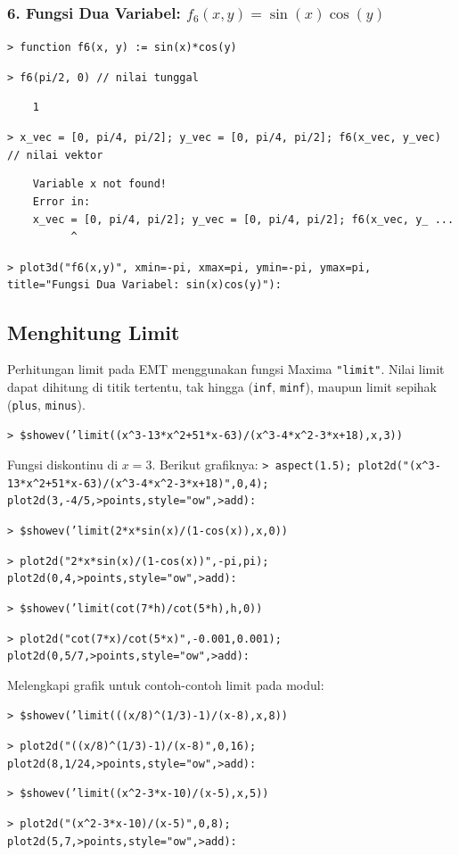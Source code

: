 \documentclass[11pt, a4paper]{article}
\newcommand{\emtcmd}[1]{\noindent\texttt{\textcolor{emtcommand}{>}\ #1}\par\smallskip}
\begin{document}
\subsubsection*{6. Fungsi Dua Variabel: $f_6(x, y) = \sin(x)\cos(y)$}
\emtcmd{function f6(x, y) := sin(x)*cos(y)}
\emtcmd{f6(pi/2, 0) \textcolor{emtcomment}{// nilai tunggal}}
\begin{verbatim}
    1
\end{verbatim}
\emtcmd{x\_vec = [0, pi/4, pi/2]; y\_vec = [0, pi/4, pi/2]; f6(x\_vec, y\_vec) \textcolor{emtcomment}{// nilai vektor}}
\begin{verbatim}
    Variable x not found!
    Error in:
    x_vec = [0, pi/4, pi/2]; y_vec = [0, pi/4, pi/2]; f6(x_vec, y_ ...
          ^
\end{verbatim}
\emtcmd{plot3d("f6(x,y)", xmin=-pi, xmax=pi, ymin=-pi, ymax=pi, title="Fungsi Dua Variabel: sin(x)cos(y)"):}

\subsection*{Menghitung Limit}

Perhitungan limit pada EMT menggunakan fungsi Maxima \texttt{"limit"}. Nilai limit dapat dihitung di titik tertentu, tak hingga (\texttt{inf}, \texttt{minf}), maupun limit sepihak (\texttt{plus}, \texttt{minus}).

\emtcmd{\$showev('limit((x\^{}3-13*x\^{}2+51*x-63)/(x\^{}3-4*x\^{}2-3*x+18),x,3))}

Fungsi diskontinu di $x = 3$. Berikut grafiknya:
\emtcmd{aspect(1.5); plot2d("(x\^{}3-13*x\^{}2+51*x-63)/(x\^{}3-4*x\^{}2-3*x+18)",0,4); plot2d(3,-4/5,>points,style="ow",>add):}

\emtcmd{\$showev('limit(2*x*sin(x)/(1-cos(x)),x,0))}
\emtcmd{plot2d("2*x*sin(x)/(1-cos(x))",-pi,pi); plot2d(0,4,>points,style="ow",>add):}

\emtcmd{\$showev('limit(cot(7*h)/cot(5*h),h,0))}
\emtcmd{plot2d("cot(7*x)/cot(5*x)",-0.001,0.001); plot2d(0,5/7,>points,style="ow",>add):}

Melengkapi grafik untuk contoh-contoh limit pada modul:

\emtcmd{\$showev('limit(((x/8)\^{}(1/3)-1)/(x-8),x,8))}
\emtcmd{plot2d("((x/8)\^{}(1/3)-1)/(x-8)",0,16); plot2d(8,1/24,>points,style="ow",>add):}

\emtcmd{\$showev('limit((x\^{}2-3*x-10)/(x-5),x,5))}
\emtcmd{plot2d("(x\^{}2-3*x-10)/(x-5)",0,8); plot2d(5,7,>points,style="ow",>add):}
\end{document}
